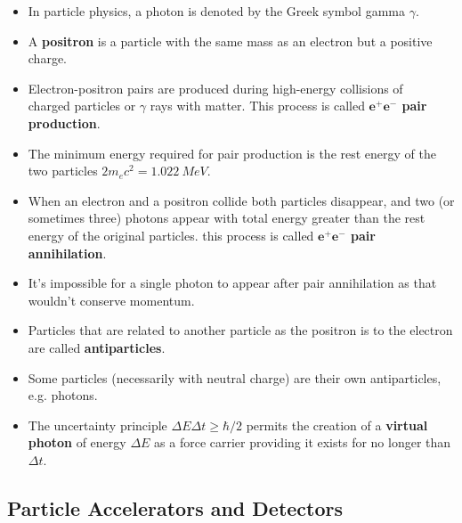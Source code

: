 \documentclass{article}
\begin{document}
\begin{itemize}
  \item In particle physics, a photon is denoted by the Greek symbol gamma $\gamma$.

  \item A \textbf{positron} is a particle with the same mass as an electron but a positive charge.

  \item Electron-positron pairs are produced during high-energy collisions of \\ charged particles or $\gamma$ rays with matter. This process is called \textbf{$\mathbf{e^+ e^-}$ pair production}.

  \item The minimum energy required for pair production is the rest energy of the two particles $2 m_e c^2 = \qty{1.022}{MeV}$.

  \item When an electron and a positron collide both particles disappear, and two (or sometimes three) photons appear with total energy greater than the rest energy of the original particles. this process is called \textbf{$\mathbf{e^+ e^-}$ pair annihilation}.

  \item It's impossible for a single photon to appear after pair annihilation as that wouldn't conserve momentum.

  \item Particles that are related to another particle as the positron is to the electron are called \textbf{antiparticles}.

  \item Some particles (necessarily with neutral charge) are their own antiparticles, e.g. photons.

  \item The uncertainty principle $\Delta E \Delta t \ge \hbar / 2$ permits the creation of a \textbf{virtual photon} of energy $\Delta E$ as a force carrier providing it exists for no longer than $\Delta t$.
\end{itemize}

\subsection{Particle Accelerators and Detectors}
\end{document}
